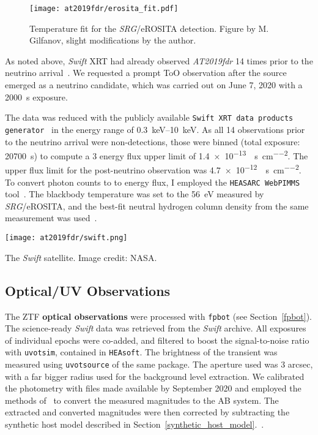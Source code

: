 \begin{figure}[htb]
    \texttt{[image: at2019fdr/erosita\_fit.pdf]}
    \caption[\textit{SRG}/eROSITA temperature fit]{Temperature fit for the \textit{SRG}/eROSITA detection. Figure by M. Gilfanov, slight modifications by the author.}
\end{figure}

As noted above, \textit{Swift} XRT had already observed \emph{AT2019fdr} 14 times prior to the neutrino arrival~\cite{Frederick2021}. We requested a prompt ToO observation after the source emerged as a neutrino candidate, which was carried out on June 7, 2020 with a \SI{2000}{\s} exposure.

The data was reduced with the publicly available \texttt{Swift XRT data products generator}~ in the energy range of \SIrange{0.3}{10}{\kilo\eV}. As all 14 observations prior to the neutrino arrival were non-detections, those were binned (total exposure: \SI{20700}{\s}) to compute a \SI{3}{\sigma} energy flux upper limit of \SI{1.4e-13}{\erg\per\s\per\square\cm}. The upper flux limit for the post-neutrino observation was \SI{4.7e-12}{\erg\per\s\per\square\cm}. To convert photon counts to to energy flux, I employed the \texttt{HEASARC WebPIMMS} tool~. The blackbody temperature was set to the \SI{56}{\eV} measured by \textit{SRG}/eROSITA, and the best-fit neutral hydrogen column density from the same measurement was used~\cite{Reusch2022}.

\begin{marginfigure}
    \texttt{[image: at2019fdr/swift.png]}
    \caption[The \textit{Swift} satellite]{The \textit{Swift} satellite. Image credit: NASA.}
\end{marginfigure}

\subsection{Optical/UV Observations}
The ZTF \textbf{optical observations} were processed with \texttt{fpbot} (see Section~\ref{fpbot}). The science-ready \textit{Swift} data was retrieved from the \textit{Swift} archive. All exposures of individual epochs were co-added, and filtered to boost the signal-to-noise ratio with \texttt{uvotsim}, contained in \texttt{HEAsoft}. The brightness of the transient was measured using \texttt{uvotsource} of the same package. The aperture used was \num{3} arcsec, with a far bigger radius used for the background level extraction. We calibrated the photometry with files made available by September 2020 and employed the methods of~ to convert the measured magnitudes to the AB system. The extracted and converted magnitudes were then corrected by subtracting the synthetic host model described in Section~\ref{synthetic_host_model}.~\cite{Reusch2022}.

